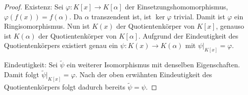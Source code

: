 \begin{proof}
    Existenz: Sei $\varphi : K[x] \to K[\alpha]$ der Einsetzungshomomorphismus, $\varphi(f(x)) = f(\alpha)$. Da $\alpha$ transzendent ist, ist $\ker \varphi$ trivial. Damit ist $\varphi$ ein Ringisomorphismus. Nun ist $K(x)$ der Quotientenkörper von $K[x]$, genauso ist $K(\alpha)$ der Quotientenkörper von $K[\alpha]$. Aufgrund der Eindeutigkeit des Quotientenkörpers existiert genau ein $\psi : K(x) \to K(\alpha)$ mit $\psi\vert_{K[x]} = \varphi$.

    Eindeutigkeit: Sei $\widetilde{\psi}$ ein weiterer Isomorphismus mit denselben Eigenschaften. Damit folgt $\widetilde{\psi}\vert_{K[x]} = \varphi$. Nach der oben erwähnten Eindeutigkeit des Quotientenkörpers folgt dadurch bereits $\widetilde{\psi} = \psi$.
\end{proof}

